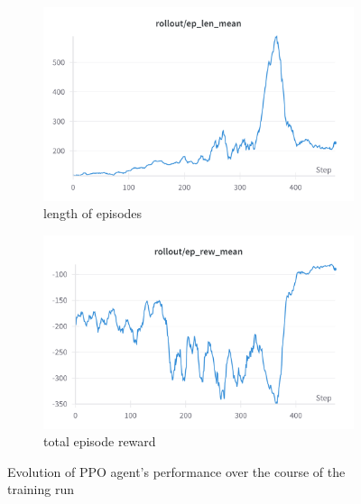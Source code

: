 \begin{figure}
    \begin{subfigure}{0.48\linewidth}
      \includegraphics[width=\linewidth]{images/auto-als-ppo-len.png}
      \caption{length of episodes}
    \end{subfigure}
    \begin{subfigure}{0.48\linewidth}
      \includegraphics[width=\linewidth]{images/auto-als-ppo-rew.png}
      \caption{total episode reward}
    \end{subfigure}
    \caption{Evolution of PPO agent's performance over the course of the training run}
\end{figure}